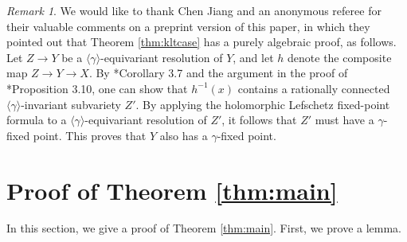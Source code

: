 \documentclass[a4paper,11pt]{amsart}
\theoremstyle{definition}
\theoremstyle{remark}
\newtheorem{rmk}[thm]{Remark}
\begin{document}
\begin{rmk}
We would like to thank Chen Jiang and an anonymous referee for their valuable comments on a preprint version of this paper, in which they pointed out that Theorem \ref{thm:kltcase} has a purely algebraic proof, as follows. 
Let $Z \to Y$ be a $\langle \gamma \rangle$-equivariant resolution of $Y$, and let $h$
denote the composite map $Z \to Y \to X$. 
By \cite{PS16}*{Corollary 3.7} and the argument in the proof of \cite{PS16}*{Proposition 3.10}, 
one can show that $h^{-1}(x)$ contains a rationally connected $\langle \gamma \rangle$-invariant subvariety $Z'$. By applying the holomorphic Lefschetz fixed-point formula to a $\langle \gamma \rangle$-equivariant resolution of $Z'$, it follows that $Z'$ must have a $\gamma$-fixed point. 
This proves that $Y$ also has a $\gamma$-fixed point. 
\end{rmk}


\section{Proof of Theorem \ref{thm:main}}\label{section:proof}

In this section, we give a proof of Theorem \ref{thm:main}. 
First, we prove a lemma. 
\end{document}

